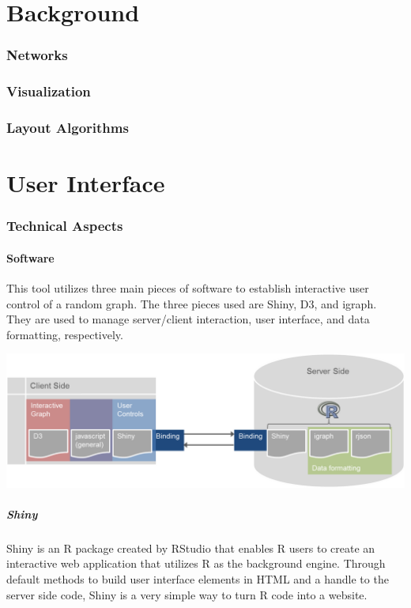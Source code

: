 \documentclass{article}\usepackage{graphicx, color}
\begin{document}
\part{Background}
\section{Networks}
\section{Visualization}
\section{Layout Algorithms}

\part{User Interface}
\section{Technical Aspects}
\subsection{Software}
This tool utilizes three main pieces of software to establish interactive user control of a random graph. The three pieces used are Shiny, D3, and igraph. They are used to manage server/client interaction, user interface, and data formatting, respectively.

\includegraphics[width=\textwidth]{images/clientserverflow.png}


\subsubsection{Shiny}
Shiny is an R package created by RStudio that enables R users to create an interactive web application that utilizes R as the background engine.\cite{rs-shiny} Through default methods to build user interface elements in HTML and a handle to the server side code, Shiny is a very simple way to turn R code into a website. 
\end{document}
